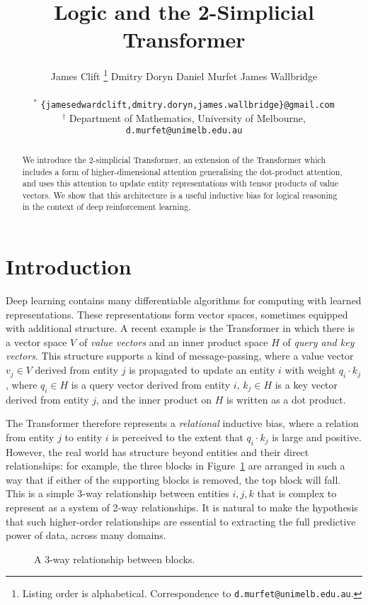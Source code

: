 \documentclass{article} %
\title{Logic and the 2-Simplicial Transformer}
\author{James Clift \thanks{Listing order is alphabetical. Correspondence to \texttt{d.murfet@unimelb.edu.au}.} \hspace{1.2cm} Dmitry Doryn \footnotemark[1] \hspace{1.2cm} Daniel Murfet 
\footnotemark[2] \hspace{1.2cm} James Wallbridge \footnotemark[1] \\
\\
${}^*$ \texttt{\{jamesedwardclift,dmitry.doryn,james.wallbridge\}@gmail.com}\\
${}^\dagger$ Department of Mathematics, University of Melbourne, \texttt{d.murfet@unimelb.edu.au}
}
\begin{document}
\maketitle

\begin{abstract}
We introduce the $2$-simplicial Transformer, an extension of the Transformer which includes a form of higher-dimensional attention generalising the dot-product attention, and uses this attention to update entity representations with tensor products of value vectors. We show that this architecture is a useful inductive bias for logical reasoning in the context of deep reinforcement learning.
\end{abstract}

\section{Introduction}

Deep learning contains many differentiable algorithms for computing with learned representations. These representations form vector spaces, sometimes equipped with additional structure. A recent example is the Transformer \citep{attention} in which there is a vector space $V$ of \emph{value vectors} and an inner product space $H$ of \emph{query and key vectors}. This structure supports a kind of message-passing, where a value vector $v_j \in V$ derived from entity $j$ is propagated to update an entity $i$ with weight $q_i \cdot k_j$, where $q_i \in H$ is a query vector derived from entity $i$, $k_j \in H$ is a key vector derived from entity $j$, and the inner product on $H$ is written as a dot product.

The Transformer therefore represents a \emph{relational} inductive bias, where a relation from entity $j$ to entity $i$ is perceived to the extent that $q_i \cdot k_j$ is large and positive. However, the real world has structure beyond entities and their direct relationships: for example, the three blocks in Figure~\ref{figure:intro_3way} are arranged in such a way that if either of the supporting blocks is removed, the top block will fall. This is a simple 3-way relationship between entities $i,j,k$ that is complex to represent as a system of 2-way relationships. It is natural to make the hypothesis that such higher-order relationships are essential to extracting the full predictive power of data, across many domains.

\begin{figure}[h]
\begin{center}
\end{center}
\caption{A $3$-way relationship between blocks.}
\label{figure:intro_3way}
\end{figure}
\end{document}
